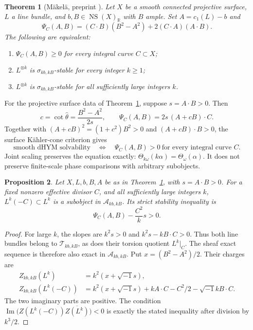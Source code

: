 \documentclass[12pt,reqno]{amsart}
\numberwithin{equation}{section}
\theoremstyle{plain}
\newtheorem{theorem}{Theorem}[section]
\newtheorem{proposition}[theorem]{Proposition}
\theoremstyle{definition}
\theoremstyle{remark}
\newcommand{\ii}{\sqrt{-1}}
\newcommand{\R}{\mathbb R}
\newcommand{\NS}{\operatorname{NS}}
\newcommand{\Ima}{\operatorname{Im}}
\begin{document}
\begin{theorem}[M\"akel\"a, preprint \cite{Makela}]\label{thm:scaling}
Let $X$ be a smooth connected projective surface, $L$ a line bundle,
and $b,B\in\NS(X)_\R$ with $B$ ample. Set $A=c_1(L)-b$ and
\[
 \Psi_C(A,B)=(C\cdot B)(B^2-A^2)+2(C\cdot A)(A\cdot B).
\]
The following are equivalent:
\begin{enumerate}
\item $\Psi_C(A,B)\ge0$ for every integral curve $C\subset X$;
\item $L^{\otimes k}$ is $\sigma_{kb,kB}$-stable for every integer $k\ge1$;
\item $L^{\otimes k}$ is $\sigma_{kb,kB}$-stable for all sufficiently large integers $k$.
\end{enumerate}
\end{theorem}

For the projective surface data of Theorem~\ref{thm:scaling}, suppose $s=A\cdot B>0$. Then
\[
 c=\cot\widehat\theta=\frac{B^2-A^2}{2s},\qquad
 \Psi_C(A,B)=2s\,(A+cB)\cdot C.
\]
Together with $(A+cB)^2=(1+c^2)B^2>0$ and $(A+cB)\cdot B>0$, the surface K\"ahler-cone criterion gives
\[
 \text{smooth dHYM solvability}\quad\Longleftrightarrow\quad
 \Psi_C(A,B)>0\ \text{for every integral curve }C.
\]
Joint scaling preserves the equation exactly:
$\Theta_{k\omega}(k\alpha)=\Theta_\omega(\alpha)$.
It does not preserve finite-scale phase comparisons with arbitrary subobjects.

\begin{proposition}\label{prop:correction}
Let $X,L,b,B,A$ be as in Theorem~\ref{thm:scaling}, with $s=A\cdot B>0$.
For a fixed nonzero effective divisor $C$, and all sufficiently large integers $k$,
$L^k(-C)\subset L^k$ is a subobject in $\mathcal A_{kb,kB}$.
Its strict stability inequality is
\[
 \Psi_C(A,B)-\frac{C^2}{k}s>0.
\]
\end{proposition}
\begin{proof}\label{proof:correction}
For large $k$, the slopes are $k^2s>0$ and $k^2s-kB\cdot C>0$.
Thus both line bundles belong to $\mathcal T_{kb,kB}$, as does their torsion
quotient $L^k|_C$. The sheaf exact sequence is therefore also exact in
$\mathcal A_{kb,kB}$. Put $x=(B^2-A^2)/2$. Their charges are
\[
 \begin{aligned}
 Z_{kb,kB}(L^k)&=k^2(x+\ii s),\\
 Z_{kb,kB}(L^k(-C))&=k^2(x+\ii s)+kA\cdot C-C^2/2-\ii kB\cdot C.
 \end{aligned}
\]
The two imaginary parts are positive. The condition
$\Ima\bigl(Z(L^k(-C))\overline{Z(L^k)}\bigr)<0$
is exactly the stated inequality after division by $k^3/2$.
\end{proof}
\end{document}
